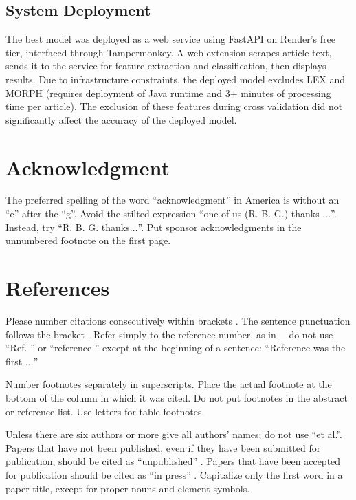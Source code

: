 \documentclass[conference]{IEEEtran}
\begin{document}
\subsection{System Deployment}
The best model was deployed as a web service using FastAPI on Render's free tier, interfaced through Tampermonkey. A web extension scrapes article text, sends it to the service for feature extraction and classification, then displays results. Due to infrastructure constraints, the deployed model excludes LEX and MORPH (requires deployment of Java runtime and 3+ minutes of processing time per article). The exclusion of these features during cross validation did not significantly affect the accuracy of the deployed model.

\section*{Acknowledgment}

The preferred spelling of the word ``acknowledgment'' in America is without 
an ``e'' after the ``g''. Avoid the stilted expression ``one of us (R. B. 
G.) thanks $\ldots$''. Instead, try ``R. B. G. thanks$\ldots$''. Put sponsor 
acknowledgments in the unnumbered footnote on the first page.

\section*{References}

Please number citations consecutively within brackets \cite{b1}. The 
sentence punctuation follows the bracket \cite{b2}. Refer simply to the reference 
number, as in \cite{b3}---do not use ``Ref. \cite{b3}'' or ``reference \cite{b3}'' except at 
the beginning of a sentence: ``Reference \cite{b3} was the first $\ldots$''

Number footnotes separately in superscripts. Place the actual footnote at 
the bottom of the column in which it was cited. Do not put footnotes in the 
abstract or reference list. Use letters for table footnotes.

Unless there are six authors or more give all authors' names; do not use 
``et al.''. Papers that have not been published, even if they have been 
submitted for publication, should be cited as ``unpublished'' \cite{b4}. Papers 
that have been accepted for publication should be cited as ``in press'' \cite{b5}. 
Capitalize only the first word in a paper title, except for proper nouns and 
element symbols.
\end{document}
